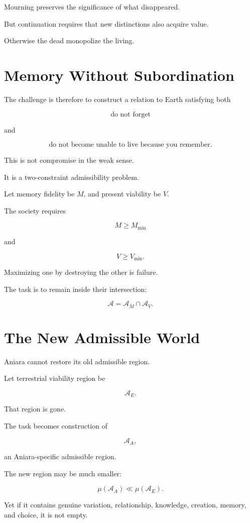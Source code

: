 \documentclass[11pt,oneside]{book}
\theoremstyle{definition}
\theoremstyle{remark}
\newcommand{\A}{\mathcal{A}}
\begin{document}
Mourning preserves the significance of what disappeared.

But continuation requires that new distinctions also acquire value.

Otherwise the dead monopolize the living.

\section{Memory Without Subordination}

The challenge is therefore to construct a relation to Earth satisfying both

\[
\text{do not forget}
\]

and

\[
\text{do not become unable to live because you remember}.
\]

This is not compromise in the weak sense.

It is a two-constraint admissibility problem.

Let memory fidelity be \(M\), and present viability be \(V\).

The society requires

\[
M\geq M_{\min}
\]

and

\[
V\geq V_{\min}.
\]

Maximizing one by destroying the other is failure.

The task is to remain inside their intersection:

\[
\A
=
\A_M\cap\A_V.
\]

\section{The New Admissible World}

Aniara cannot restore its old admissible region.

Let terrestrial viability region be

\[
\A_E.
\]

That region is gone.

The task becomes construction of

\[
\A_A,
\]

an Aniara-specific admissible region.

The new region may be much smaller:

\[
\mu(\A_A)
\ll
\mu(\A_E).
\]

Yet if it contains genuine variation, relationship, knowledge, creation, memory, and choice, it is not empty.
\end{document}
